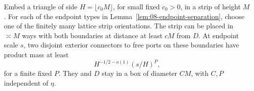 \begin{lemma}
\label{lem:08-connectors}
Embed a triangle of side \(H=\lfloor c_0M\rfloor\), for small fixed
\(c_0>0\), in a strip of height \(M\). For each of the endpoint types
in Lemma~\ref{lem:08-endpoint-separation}, choose one of the finitely many
lattice strip orientations. The strip can be placed in \(\asymp M\)
ways with both boundaries at distance at least \(cM\) from \(D\).
At endpoint scale $s$, two disjoint exterior connectors to free ports
on these boundaries have product mass at least
\begin{equation}
 H^{-1/2-o(1)}(s/H)^P,
 \label{eq:R-32c}
\end{equation}
for a finite fixed \(P\). They and \(D\) stay in a box of diameter
\(CM\), with \(C,P\) independent of \(\eta\).
\end{lemma}
